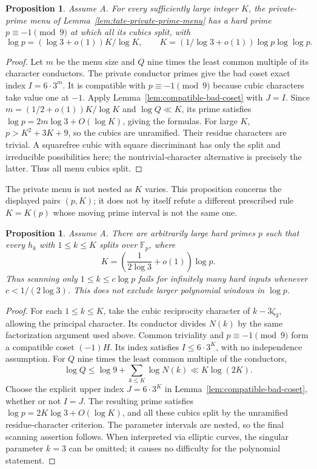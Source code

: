 \documentclass[11pt]{article}
\newtheorem{proposition}[theorem]{Proposition}
\theoremstyle{definition}
\theoremstyle{remark}
\begin{document}
\begin{proposition}\label{prop:private-tate-lower-comparison}
Assume A.  For every sufficiently large integer $K$, the private-prime
menu of Lemma~\ref{lem:tate-private-prime-menu} has a hard prime
$p\equiv-1\pmod9$ at which all its cubics split, with
\[
 \log p=(\log3+o(1))K/\log K,
 \qquad
 K=(1/\log3+o(1))\log p\log\log p.
\]
\end{proposition}

\begin{proof}
Let $m$ be the menu size and $Q$ nine times the least common
multiple of its character conductors.  The private conductor primes
give the bad coset exact index $I=6\cdot3^m$.  It is compatible
with $p\equiv-1\pmod9$ because cubic characters take value one
at $-1$.  Apply Lemma~\ref{lem:compatible-bad-coset} with $J=I$.
Since $m=(1/2+o(1))K/\log K$ and $\log Q\ll K$, its prime
satisfies $\log p=2m\log3+O(\log K)$, giving the formulas.
For large $K$, $p>K^2+3K+9$, so the cubics are unramified.
Their residue characters are trivial.  A squarefree cubic with
square discriminant has only the split and irreducible possibilities
here; the nontrivial-character alternative is precisely the latter.
Thus all menu cubics split.
\end{proof}

The private menu is not nested as $K$ varies.  This proposition
concerns the displayed pairs $(p,K)$; it does not by itself refute
a different prescribed rule $K=K(p)$ whose moving prime interval
is not the same one.

\begin{proposition}\label{prop:full-tate-lower-comparison}
Assume A.  There are arbitrarily large hard primes $p$ such that
every $h_k$ with $1\le k\le K$ splits over $\mathbb F_p$, where
\[
 K=\left(\frac1{2\log3}+o(1)\right)\log p.
\]
Thus scanning only $1\le k\le c\log p$ fails for infinitely
many hard inputs whenever $c<1/(2\log3)$.  This does not exclude
larger polynomial windows in $\log p$.
\end{proposition}

\begin{proof}
For each $1\le k\le K$, take the cubic reciprocity character
of $k-3\zeta_3$, allowing the principal character.  Its conductor
divides $N(k)$ by the same factorization argument used above.
Common triviality and $p\equiv-1\pmod9$ form a compatible coset
$(-1)H$.  Its index satisfies $I\le6\cdot3^K$, with no
independence assumption.  For $Q$ nine times the least common
multiple of the conductors,
\[
 \log Q\le\log9+\sum_{k\le K}\log N(k)\ll K\log(2K).
\]
Choose the explicit upper index $J=6\cdot3^K$ in
Lemma~\ref{lem:compatible-bad-coset}, whether or not $I=J$.
The resulting prime satisfies
$\log p=2K\log3+O(\log K)$, and all these cubics split by
the unramified residue-character criterion.  The parameter intervals
are nested, so the final scanning assertion follows.
When interpreted via elliptic curves, the singular parameter $k=3$
can be omitted; it causes no difficulty for the polynomial statement.
\end{proof}
\end{document}
